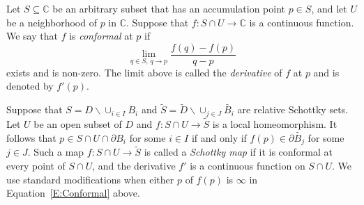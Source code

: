 \documentclass[12pt]{amsart}
\newtheorem{lem}[thm]{Lemma}
\newcommand{\C}{\mathbb{C}}
\newcommand{\sub}{\subseteq }
\newcommand{\J}{\mathcal{J}}
\newcommand{\co}{\colon}
\begin{document}


Let $S\sub \C$ be an arbitrary subset that has an accumulation point $p\in S$, and let $U$ be a neighborhood of $p$ in $\C$.
Suppose that $f\co S\cap U\to \C$ is a continuous function. We say that $f$ is \textit{conformal} at $p$ if 
\begin{equation}\label{E:Conformal}
	\lim_{q\in S,\, q\to p}\frac{f(q)-f(p)}{q-p}
\end{equation}
exists and is non-zero. The limit above is called the \textit{derivative} of $f$ at $p$ and is denoted by $f'(p)$.


Suppose that $S=D\backslash \cup_{i\in I}B_i$ and $\widetilde{S}=\widetilde{D}\backslash \cup_{j\in J}\widetilde{B_i}$ are relative Schottky sets.
Let $U$ be an open subset of $D$ and $f\co S\cap U\to \widetilde{S}$ is a local homeomorphism.
It follows that $p\in S\cap U\cap \partial B_i$ for some $i\in I$ if and only if 
$f(p)\in \partial \widetilde{B_j}$ for some $j\in J$. Such a map $f\co S\cap U\to \widetilde{S}$ is called a \textit{Schottky map} if it is conformal at every point of $S\cap U$, and the derivative $f'$ is a continuous function on $S\cap U$. We use standard modifications when either $p$ of $f(p)$ is $\infty$ in Equation~\eqref{E:Conformal} above.
\end{document}
